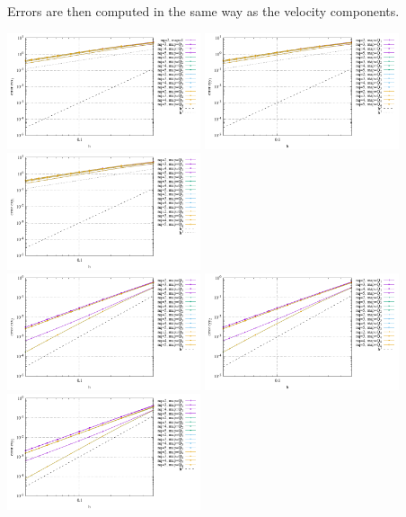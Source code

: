 Errors are then computed in the same way as the velocity components.

\begin{center}
\includegraphics[width=5.7cm]{python_codes/fieldstone_152/results/exp0/err_exx1}
\includegraphics[width=5.7cm]{python_codes/fieldstone_152/results/exp0/err_eyy1}
\includegraphics[width=5.7cm]{python_codes/fieldstone_152/results/exp0/err_exy1}\\
\includegraphics[width=5.7cm]{python_codes/fieldstone_152/results/exp0/err_exx2}
\includegraphics[width=5.7cm]{python_codes/fieldstone_152/results/exp0/err_eyy2}
\includegraphics[width=5.7cm]{python_codes/fieldstone_152/results/exp0/err_exy2}\\

\end{center}
